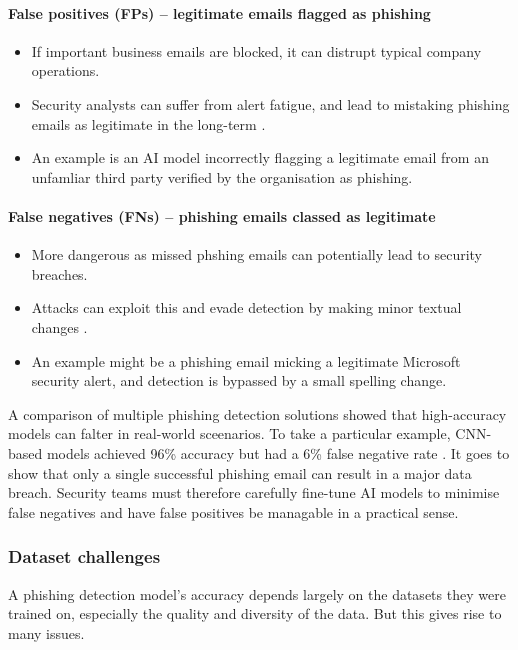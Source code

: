\paragraph{False positives (FPs) -- legitimate emails flagged as phishing}
\begin{itemize}
    \item If important business emails are blocked, it can distrupt typical company operations.
    \item Security analysts can suffer from alert fatigue, and lead to mistaking phishing emails as legitimate in the long-term \citep{patil2015survey}.
    \item An example is an AI model incorrectly flagging a legitimate email from an unfamliar third party verified by the organisation as phishing.
\end{itemize}

\paragraph{False negatives (FNs) -- phishing emails classed as legitimate}
\begin{itemize}
    \item More dangerous as missed phshing emails can potentially lead to security breaches.
    \item Attacks can exploit this and evade detection by making minor textual changes \citep{carlini2017adversarial}.
    \item An example might be a phishing email micking a legitimate Microsoft security alert, and detection is bypassed by a small spelling change.
\end{itemize}

\noindent A comparison of multiple phishing detection solutions showed that high-accuracy models can falter in real-world sceenarios. To take a particular example, CNN-based models achieved 96\% accuracy but had a 6\% false negative rate \citep{verma2022classification}. It goes to show that only a single successful phishing email can result in a major data breach. Security teams must therefore carefully fine-tune AI models to minimise false negatives and have false positives be managable in a practical sense.

\subsubsection*{Dataset challenges}
A phishing detection model's accuracy depends largely on the datasets they were trained on, especially the quality and diversity of the data. But this gives rise to many issues.

